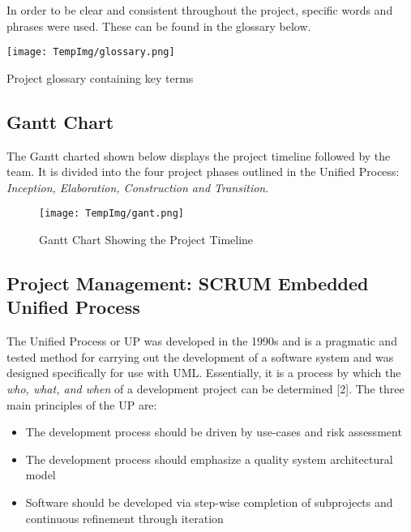 \documentclass[fontsize=11pt]{extarticle}
\numberwithin{figure}{section} %
\numberwithin{table}{section}%
\begin{document}
In order to be clear and consistent throughout the project, specific
words and phrases were used. These can be found in the glossary below.

\begin{table}[H]
      \centering
      \texttt{[image: TempImg/glossary.png]}
      \caption{Project glossary containing key terms}
\label{conreq}
 \end{table}

\hypertarget{gantt-chart}{%
\subsection{Gantt Chart}\label{gantt-chart}}

The Gantt charted shown below displays the project timeline followed by
the team. It is divided into the four project phases outlined in the
Unified Process:
\textit{Inception, Elaboration, Construction and Transition}.

\begin{figure}[H]
      \centering
      \texttt{[image: TempImg/gant.png]}
      \caption{Gantt Chart Showing the Project Timeline}
 \end{figure}

\hypertarget{project-management-scrum-embedded-unified-process}{%
\subsection{Project Management: SCRUM Embedded Unified
Process}\label{project-management-scrum-embedded-unified-process}}

The Unified Process or UP was developed in the 1990s and is a pragmatic
and tested method for carrying out the development of a software system
and was designed specifically for use with UML. Essentially, it is a
process by which the \textit{who, what, and when} of a development
project can be determined {[}2{]}. The three main principles of the UP
are:

\begin{itemize}
  \item The development process should be driven by use-cases and risk assessment
  \item The development process should emphasize a quality system architectural model 
  \item Software should be developed via step-wise completion of subprojects and continuous refinement through iteration
\end{itemize}
\end{document}
